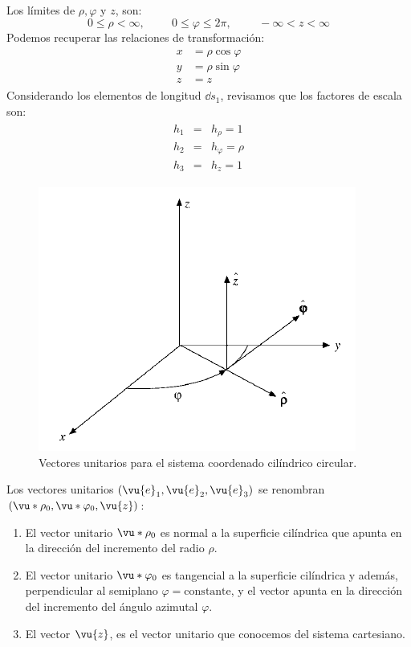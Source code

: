 Los límites de $\rho, \varphi$ y $z$, son:
\[ 0 \leq \rho < \infty, \hspace{1cm} 0 \leq \varphi \leq 2 \pi, \hspace{1cm} -\infty < z < \infty \]
Podemos recuperar las relaciones de transformación:
\begin{align*}
\begin{aligned}
x &= \rho \cos \varphi \\
y &= \rho \sin \varphi \\
z &= z
\end{aligned}
\end{align*}
Considerando los elementos de longitud $\dd{s_{1}}$, revisamos que los factores de escala son:
\begin{align*}
\begin{aligned}
h_{1} &=& h_{\rho} = 1 \\
h_{2} &=& h_{\varphi} = \rho \\
h_{3} &=& h_{z} = 1
\end{aligned}
\end{align*}
\begin{figure}[H]
    \centering
    \includegraphics[scale=0.5]{Imagenes/CoordenadasCilindricas_Vector_Unitario.png}
    \caption{Vectores unitarios para el sistema coordenado cilíndrico circular.}
\end{figure}
Los vectores unitarios $(\vu{e}_{1},\vu{e}_{2},\vu{e}_{3})$ se renombran $(\vu*{\rho}_{0},\vu*{\varphi}_{0},\vu{z})$:
\begin{enumerate}
\item El vector unitario $\vu*{\rho}_{0}$ es normal a la superficie cilíndrica que apunta en la dirección del incremento del radio $\rho$.
\item El vector unitario $\vu*{\varphi}_{0}$ es tangencial a la superficie cilíndrica y además, perpendicular al semiplano $\varphi=\text{constante}$, y el vector apunta en la dirección del incremento del ángulo azimutal $\varphi$.
\item El vector $\vu{z}$, es el vector unitario que conocemos del sistema cartesiano.
\end{enumerate}
